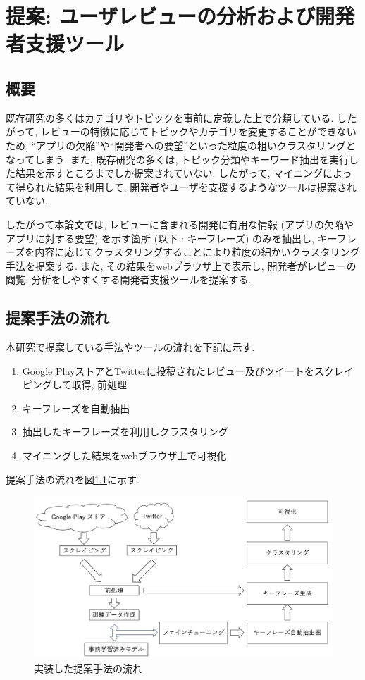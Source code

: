 \chapter{提案: ユーザレビューの分析および開発者支援ツール}
\label{chap:teian}


\section{概要}
既存研究の多くはカテゴリやトピックを事前に定義した上で分類している. したがって, レビューの特徴に応じてトピックやカテゴリを変更することができないため, ``アプリの欠陥''や``開発者への要望''といった粒度の粗いクラスタリングとなってしまう. 
また, 既存研究の多くは, トピック分類やキーワード抽出を実行した結果を示すところまでしか提案されていない. したがって, マイニングによって得られた結果を利用して, 開発者やユーザを支援するようなツールは提案されていない. 

したがって本論文では, レビューに含まれる開発に有用な情報 (アプリの欠陥やアプリに対する要望) を示す箇所 (以下 : キーフレーズ) のみを抽出し, キーフレーズを内容に応じてクラスタリングすることにより粒度の細かいクラスタリング手法を提案する. 
また, その結果をwebブラウザ上で表示し, 開発者がレビューの閲覧, 分析をしやすくする開発者支援ツールを提案する. 

\section{提案手法の流れ}
本研究で提案している手法やツールの流れを下記に示す. 

\begin{enumerate}
  \item Google PlayストアとTwitterに投稿されたレビュー及びツイートをスクレイピングして取得, 前処理
  \item キーフレーズを自動抽出
  \item 抽出したキーフレーズを利用しクラスタリング
  \item マイニングした結果をwebブラウザ上で可視化
\end{enumerate}

提案手法の流れを図\ref{fig:nagare}に示す. 

\begin{figure}[H]
  \centering
  \includegraphics[scale=0.35]
    {contents/images/zisso.png}
  \caption{実装した提案手法の流れ\label{fig:nagare}}
\end{figure}

